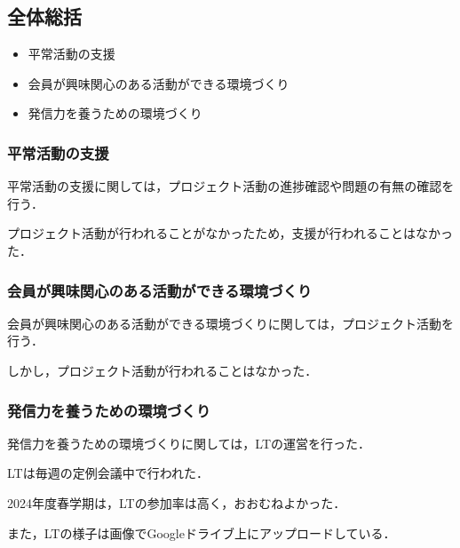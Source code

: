 \subsection*{全体総括}


\begin{itemize}
    \item 平常活動の支援
    \item 会員が興味関心のある活動ができる環境づくり
    \item 発信力を養うための環境づくり
  \end{itemize}
  
  \subsubsection*{平常活動の支援}
  平常活動の支援に関しては，プロジェクト活動の進捗確認や問題の有無の確認を行う．
  
  プロジェクト活動が行われることがなかったため，支援が行われることはなかった．
  
  \subsubsection*{会員が興味関心のある活動ができる環境づくり}
  会員が興味関心のある活動ができる環境づくりに関しては，プロジェクト活動を行う．

  しかし，プロジェクト活動が行われることはなかった．
  
  \subsubsection*{発信力を養うための環境づくり}
  発信力を養うための環境づくりに関しては，LTの運営を行った．
  
  LTは毎週の定例会議中で行われた．
  
  2024年度春学期は，LTの参加率は高く，おおむねよかった．
  
  また，LTの様子は画像でGoogleドライブ上にアップロードしている．
  